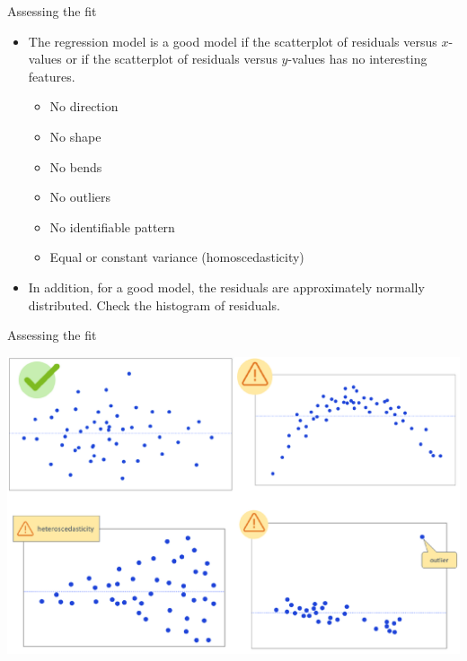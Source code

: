 \documentclass[
  ignorenonframetext,
]{beamer}
\providecommand{\tightlist}{%
  \setlength{\itemsep}{0pt}\setlength{\parskip}{0pt}}
\begin{document}
\begin{frame}{Assessing the fit}
\protect\hypertarget{assessing-the-fit}{}
\begin{itemize}
\item
  The regression model is a good model if the scatterplot of residuals
  versus \(x\)-values or if the scatterplot of residuals versus
  \(\hat{y}\)-values has no interesting features.

  \begin{itemize}
  \tightlist
  \item
    No direction
  \item
    No shape
  \item
    No bends
  \item
    No outliers
  \item
    No identifiable pattern
  \item
    Equal or constant variance (homoscedasticity)
  \end{itemize}
\item
  In addition, for a good model, the residuals are approximately
  normally distributed. Check the histogram of residuals.
\end{itemize}
\end{frame}

\begin{frame}{Assessing the fit}
\protect\hypertarget{assessing-the-fit-1}{}
\begin{center}\includegraphics[width=0.9\linewidth]{Week4_Lect_files/figure-beamer/unnamed-chunk-25-1} \end{center}
\end{frame}
\end{document}
